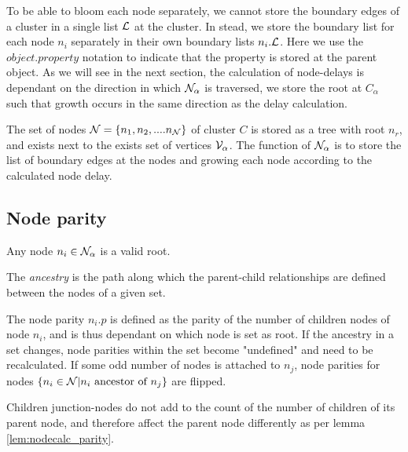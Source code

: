 

To be able to bloom each node separately, we cannot store the boundary edges of a cluster in a single list $\mathcal{L}$ at the cluster. In stead, we store the boundary list for each node $n_i$ separately in their own boundary lists $n_i.\mathcal{L}$. Here we use the $object.property$ notation to indicate that the property is stored at the parent object. As we will see in the next section, the calculation of node-delays is dependant on the direction in which $\mathcal{N}_\alpha$ is traversed, we store the root at $C_\alpha$ such that growth occurs in the same direction as the delay calculation.

\begin{theorem}
  The set of nodes $\mathcal{N} = \{n_1, n_2, .... n_{\mathcal{N}}\}$ of cluster $C$ is stored as a tree with root $n_r$, and exists next to the exists set of vertices $\mathcal{V}_\alpha$. The function of $\mathcal{N}_\alpha$ is to store the list of boundary edges at the nodes and growing each node according to the calculated node delay.
\end{theorem}


\subsection{Node parity}


\begin{lemma}
  Any node $n_i \in \mathcal{N}_\alpha$ is a valid root.
\end{lemma}

The \emph{ancestry} is the path along which the parent-child relationships are defined between the nodes of a given set.

\begin{lemma}\label{lem:nodecalc_parity}
  The node parity $n_i.p$ is defined as the parity of the number of children nodes of node $n_i$, and is thus dependant on which node is set as root. If the ancestry in a set changes, node parities within the set become "undefined" and need to be recalculated. If some odd number of nodes is attached to $n_j$, node parities for nodes $\{n_i \in \mathcal{N} | n_i \mbox{ ancestor of } n_j\}$ are flipped.
\end{lemma}

\begin{lemma}\label{lem:nodecalc_junction}
  Children junction-nodes do not add to the count of the number of children of its parent node, and therefore affect the parent node differently as per lemma \ref{lem:nodecalc_parity}.
\end{lemma}

